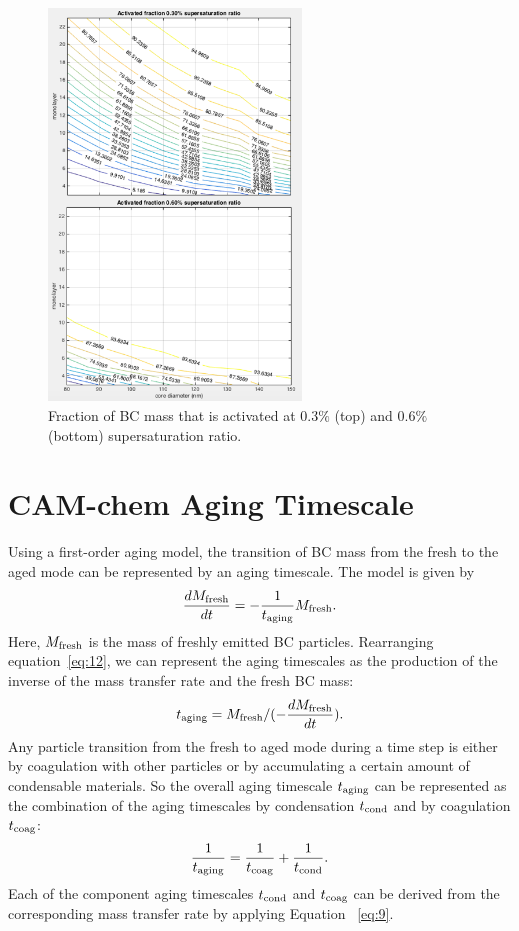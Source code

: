 \documentclass[12pt, fullpage]{uiucthesis2009}
\begin{document}
		\begin{figure}[h] 
			\begin{center}
				\includegraphics[width = 0.6\textwidth]{Figure10}
				\caption[Fraction of BC mass that is activated at 0.3$\%$ (top) and 0.6$\%$ (bottom) supersaturation ratio]{\label{fig_P10} Fraction of BC mass that is activated at 0.3$\%$ (top) and 0.6$\%$ (bottom) supersaturation ratio.}
			\end{center}
		\end{figure}
	\section{CAM-chem Aging Timescale}
	Using a first-order aging model, the transition of BC mass from the fresh to the aged mode can be represented by an aging timescale. The model is given by
	\begin{align}\label{eq:12}
	\frac{dM_{\rm{fresh}}}{dt} = -\frac{1}{t_{\rm{aging}}}M_{\rm{fresh}}. 
	\end{align}
	Here, $M_{\rm{fresh}}$ is the mass of freshly emitted BC particles.
	Rearranging equation~\ref{eq:12}, we can represent the aging timescales as the production of the inverse of the mass transfer rate and the fresh BC mass: 
	\begin{align}\label{eq:9}
	t_{\rm{aging}} = M_{\rm{fresh}}/(-\frac{dM_{\rm{fresh}}}{dt}).
	\end{align}
	Any particle transition from the fresh to aged mode during a time step is either by coagulation with other particles or by accumulating a certain amount of condensable materials. So the overall aging timescale $t_{\rm{aging}}$ can be represented as the combination of the aging timescales by condensation $t_{\rm{cond}}$ and by coagulation $t_{\rm{coag}}$:
	\begin{align}\label{eq:10}
	\frac{1}{t_{\rm{aging}}} =\frac{1}{t_{\rm{coag}}} + \frac{1}{t_{\rm{cond}}}.
	\end{align}
	Each of the component aging timescales $t_{\rm{cond}}$ and $t_{\rm{coag}}$ can be derived from the corresponding mass transfer rate by applying Equation~ \ref{eq:9}. 
	
\end{document}
